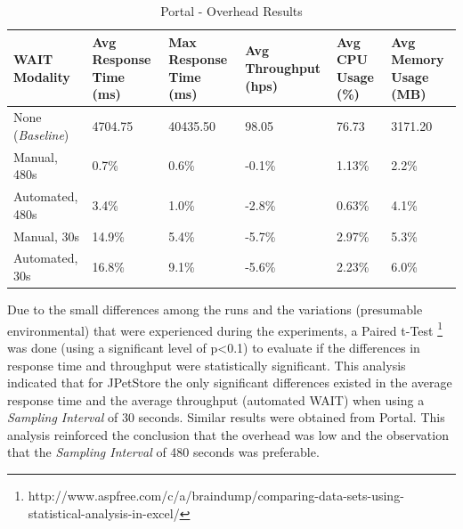 \documentclass[runningheads,a4paper]{llncs}
\begin{document}
\begin{table}[!h]
\caption{Portal - Overhead Results}
\label{Portal1}
\centering
\begin{tabular}{p{}|p{}|p{}|p{}|p{}|p{}}
\hline
\bfseries WAIT Modality & \bfseries Avg Response Time (ms)& \bfseries Max
Response Time (ms)& \bfseries Avg Throughput (hps)& \bfseries Avg CPU Usage
(\%) & \bfseries Avg Memory Usage (MB)\\
\hline
None (\emph{Baseline}) 	& 4704.75	& 40435.50	& 98.05 	& 76.73 	& 3171.20\\
Manual, 480s 			& 0.7\% 	& 0.6\%		& -0.1\%	& 1.13\% 	& 2.2\%\\
Automated, 480s 		& 3.4\%		& 1.0\%		& -2.8\% 	& 0.63\% 	& 4.1\%\\
Manual, 30s 			& 14.9\%	& 5.4\%		& -5.7\% 	& 2.97\% 	& 5.3\%\\
Automated, 30s 			& 16.8\%	& 9.1\%		& -5.6\% 	& 2.23\% 	& 6.0\%\\
\hline
\end{tabular}
\end{table}

Due to the small differences among the runs and the variations (presumable
environmental) that were experienced during the experiments, a Paired t-Test
\footnote{http://www.aspfree.com/c/a/braindump/comparing-data-sets-using-statistical-analysis-in-excel/}
was done (using a significant level of p\textless0.1) to evaluate if the
differences in response time and throughput were statistically significant. 
This analysis indicated that 
for JPetStore the only significant differences existed in the average response
time and the average throughput (automated WAIT) when using a \emph{Sampling Interval} of 30
seconds. Similar results were obtained from Portal. This analysis reinforced the
conclusion that the overhead was low and the observation that the
\emph{Sampling Interval} of 480 seconds was preferable.
\end{document}
